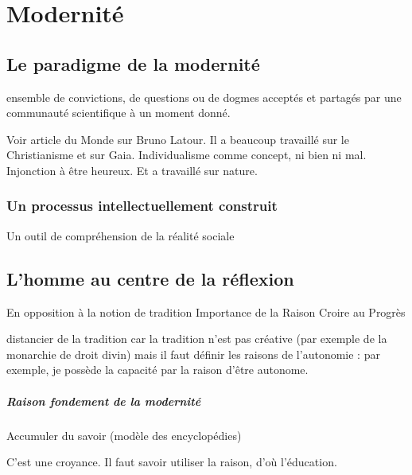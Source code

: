 \chapter{Modernité}

\section{Le paradigme de la modernité}
\begin{Def}[Paradigme]
ensemble de convictions, de questions ou de dogmes acceptés et partagés par une
communauté scientifique à un moment donné.
\end{Def}

\begin{Ex}
Voir article du Monde sur Bruno Latour. Il a beaucoup travaillé sur le Christianisme et sur Gaia.
Individualisme comme concept, ni bien ni mal.
Injonction à être heureux.
Et a travaillé sur nature.
\end{Ex}
\subsection{Un processus intellectuellement construit}

Un outil de compréhension de la réalité sociale





\section{L’homme au centre de la réflexion}
En opposition à la notion de tradition
Importance de la Raison
Croire au Progrès






\begin{Synthesis}
distancier de la tradition car la tradition n'est pas créative (par exemple de la monarchie de droit divin)
mais il faut définir les raisons de l'autonomie : par exemple, je possède la capacité par la raison d'être autonome.
\end{Synthesis}

\paragraph{Raison fondement de la modernité}Accumuler du savoir (modèle des encyclopédies)

C'est une croyance. Il faut savoir utiliser la raison, d'où l'éducation. 

